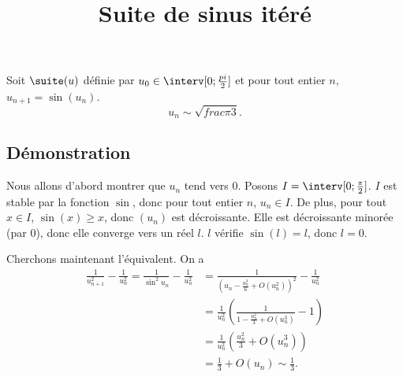 \documentclass[fontsize=12pt,twoside=false,parskip=half]{scrartcl}
\title{Suite de sinus itéré}
\date{}
\author{}
\begin{document}
\maketitle
   \begin{Theoreme}
      Soit $\suite(u)$ définie par $u_0 \in \interv[0; \frac{pi}{2}]$ et pour tout entier $n$, $u_{n + 1} = \sin(u_n)$.
      \[
         u_n \sim \sqrt{frac{\pi}{3}}.
      \]
   \end{Theoreme}
   \subsection{Démonstration}
      Nous allons d’abord montrer que $u_n$ tend vers 0. Posons $I = \interv[0; \frac{\pi}{2}]$.
      $I$ est stable par la fonction $\sin$, donc pour tout entier $n$, $u_n \in I$. De plus,
      pour tout $x \in I$, $\sin(x) \geq x$, donc $(u_n)$ est décroissante. Elle est 
      décroissante minorée (par $0$), donc elle converge vers un réel $l$. $l$ vérifie 
      $\sin(l) = l$, donc $l = 0$.
      
      Cherchons maintenant l’équivalent. On a 
      \begin{align*}
         \frac{1}{u_{n + 1}^2} - \frac{1}{u_n^2} = \frac{1}{\sin^2 u_n} - \frac{1}{u_n^2} &= \frac{1}{\left(u_n - \frac{u_n^3}{6} + O(u_n^2)\right)^2} - \frac{1}{u_n^2}\\
                                                 &= \frac{1}{u_n^2} \left( \frac{1}{1 - \frac{u_n^2}{3} + O(u_n^3)} - 1\right)\\
                                                 &= \frac{1}{u_n^2} \left( \frac{u_n^2}{3} + O(u_n^3) \right)\\
                                                 &= \frac{1}{3} + O(u_n) \sim \frac{1}{3}.                                                
      \end{align*}
      
\end{document}
